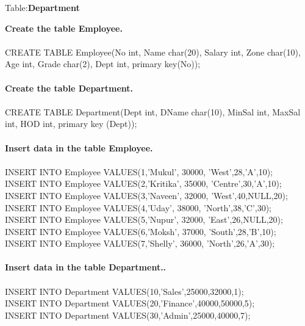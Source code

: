 \documentclass[
a4paper]{article}
\begin{document}
\begin{large}
\begin{center}
			Table:\textbf{Department}
			\vspace{0.5cm}
		\end{center}
		\textbf{Create the table Employee.}\\
		\\
		CREATE TABLE Employee(No int, Name char(20), Salary int, Zone char(10), Age int, Grade char(2), Dept int, primary key(No));\\\textbf{}
		\\				
		\textbf{Create the table Department.}\\
		\\
		CREATE TABLE Department(Dept int, DName char(10), MinSal int, MaxSal int, HOD int, primary key (Dept));\\
		\\
		\textbf{Insert data in the table Employee.}\\
		\\
		INSERT INTO Employee VALUES(1,'Mukul', 30000, 'West',28,'A',10);\vspace{0.2cm}\\
		INSERT INTO Employee VALUES(2,'Kritika', 35000, 'Centre',30,'A',10);\vspace{0.2cm}\\
		INSERT INTO Employee VALUES(3,'Naveen', 32000, 'West',40,NULL,20);\vspace{0.2cm}\\
		INSERT INTO Employee VALUES(4,'Uday', 38000, 'North',38,'C',30);\vspace{0.2cm}\\
		INSERT INTO Employee VALUES(5,'Nupur', 32000, 'East',26,NULL,20);\vspace{0.2cm}\\
		INSERT INTO Employee VALUES(6,'Moksh', 37000, 'South',28,'B',10);\vspace{0.2cm}\\
		INSERT INTO Employee VALUES(7,'Shelly', 36000, 'North',26,'A',30);\\
		\\
		\textbf{Insert data in the table Department..}\\
		\\
		INSERT INTO Department VALUES(10,'Sales',25000,32000,1);\vspace{0.2cm}\\
		INSERT INTO Department VALUES(20,'Finance',40000,50000,5);\vspace{0.2cm}\\
		INSERT INTO Department VALUES(30,'Admin',25000,40000,7);\\

\end{large}
\end{document}

